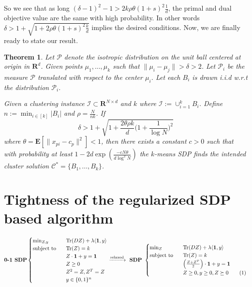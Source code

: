 \documentclass[12pt]{article}
\newcommand{\mc}{\mathcal}
\newcommand{\mb}{\mathbf}
\newcommand{\tr}{\text{Tr}}
\newcommand\numberthis{\addtocounter{equation}{1}\tag{\theequation}}
\newtheorem{theorem}{Theorem}
\begin{document}
So we see that as long $(\delta - 1)^2 - 1 > 2k\rho\theta (1+s)^2\frac{1}{d}$, the primal and dual objective value are the same with high probability. In other words $\delta > 1 + \sqrt{1+2\rho\theta(1+s)^2\frac{k}{d}}$ implies the desired conditions. Now, we are finally ready to state our result.

\begin{theorem}
\label{a-thm:SDPIsometric}
Let $\mc P$ denote the isotropic distribution on the unit ball centered at origin in $\mb R^d$. Given points $\mu_1, \ldots, \mu_k$ such that $\|\mu_i - \mu_j\| > \delta  > 2$. Let $\mc P_i$ be the measure $\mc P$ translated with respect to the center $\mu_i$. Let each $B_i$ is drawn i.i.d w.r.t the distribution $\mc P_i$. 

Given a clustering instance $\mc I \subset \mb R^{N\times d}$ and $k$ where $\mc I := \cup_{i=1}^k B_i$. Define $ n := \min_{i\in[k]} |B_i|$ and $\rho = \frac{N}{nk}$. If
$$\delta > 1 + \sqrt{1+\frac{2\theta\rho k}{d}\Big(1+\frac{1}{\log N}\Big)^2}$$  
where $\theta = \mb E[\|x_{pi}-c_p\|^2] < 1$, then there exists a constant $c > 0$ such that with probability at least $1 - 2d\exp(\frac{-cN\theta}{d\log^2N})$ the $k$-means SDP finds the intended cluster solution  $\mc C^* = \{B_1, \ldots, B_k\}$.
\end{theorem}

\section{Tightness of the regularized SDP based algorithm}
\begin{equation*}
	\textbf{0-1 SDP} 
	\begin{cases}
		\min_{Z, y} \enspace &\tr(DZ) + \lambda \langle \mb 1, y\rangle\\
		\text{subject to } \enspace &\tr(Z) = k\\
		& Z\cdot \mb 1 + y = \mb 1\\	
		&Z\ge 0\\
		&Z^2 = Z, Z^T = Z \\
		& y \in \{0, 1\}^n
	\end{cases}
	\xrightarrow{\text{relaxed}} \textbf{ SDP } 
	\begin{cases}
		\min_{Z} \enspace &\tr(DZ) + \lambda \langle \mb 1, y\rangle\\
        \text{subject to } \enspace &\tr(Z) = k\\
		& \Big(\frac{Z+Z^T}{2}\Big)\cdot \mb 1 + y = \mb 1\\		
		&Z \ge 0, y \ge 0, Z \succeq 0 \numberthis\label{a-eqn:regularizedSDP}
	\end{cases}
\end{equation*}
\end{document}
